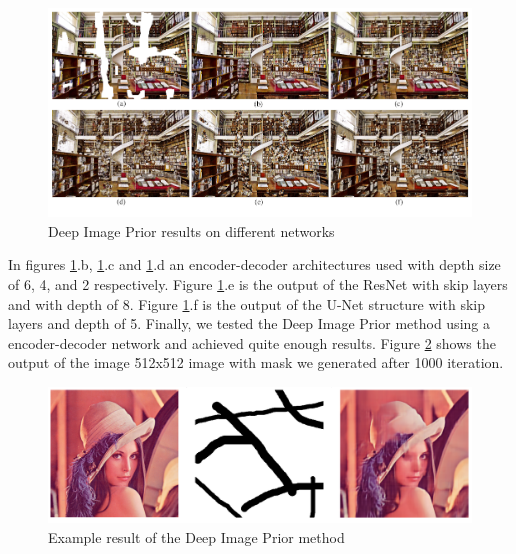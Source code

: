 \begin{figure}[h]
    \centering
    \includegraphics[width=13cm]{figures/chapter4/imprior4.png}
    \caption{Deep Image Prior results on different networks \cite{deep_image_prior}}
    \label{fig:prior_multimodels}
\end{figure}

In figures \ref{fig:prior_multimodels}.b, \ref{fig:prior_multimodels}.c and \ref{fig:prior_multimodels}.d an encoder-decoder architectures used with depth size of 6, 4, and 2 respectively. Figure \ref{fig:prior_multimodels}.e is the output of the ResNet with skip layers and with depth of 8. Figure \ref{fig:prior_multimodels}.f is the output of the U-Net structure with skip layers and depth of 5. Finally, we tested the Deep Image Prior method using a encoder-decoder network and achieved quite enough results. Figure \ref{fig:prior_lenna} shows the output of the image 512x512 image with mask we generated after 1000 iteration.

\begin{figure}[h]
    \centering
    \includegraphics[width=14cm]{figures/chapter4/impriorout.png}
    \vspace*{3mm}
    \caption{Example result of the Deep Image Prior method}
    \label{fig:prior_lenna}
\end{figure}